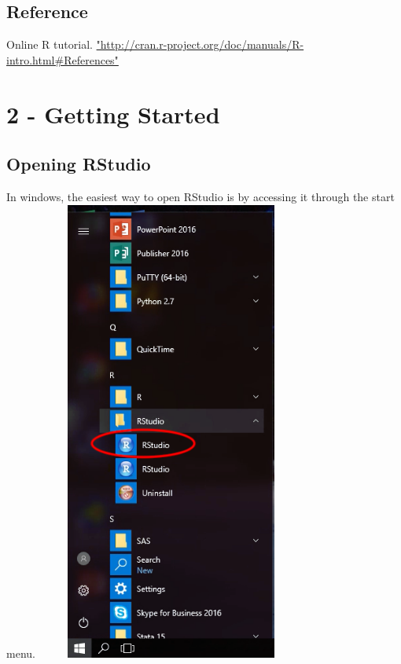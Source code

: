 \documentclass[a4paper]{report}
\begin{document}
\begin{flushleft}
      \end{flushleft}

       
      
    
    \section{Reference}
    Online R tutorial. \underline{"http://cran.r-project.org/doc/manuals/R-intro.html#References"}

\chapter{2 - Getting Started}

    \section{Opening RStudio}
        \begin{flushleft}
        In windows, the easiest way to open RStudio is by accessing it through the start menu. 
        \newline
        \includegraphics[width=3.5in, height=6in]{images/GS1.png}
        \end{flushleft}
\end{document}
